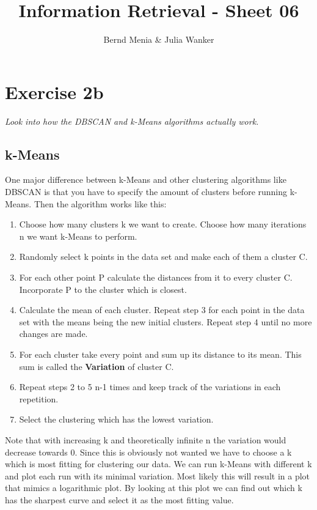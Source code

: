 \documentclass{article}
\author{Bernd Menia \& Julia Wanker}
\title{Information Retrieval - Sheet 06}
\begin{document}
	
\maketitle

\section{Exercise 2b}
\textit{Look into how the DBSCAN and k-Means algorithms actually work.}

\subsection{k-Means}
One major difference between k-Means and other clustering algorithms like DBSCAN is that you have to specify the amount of clusters before running k-Means. Then the algorithm works like this:  

\begin{enumerate}
	\item Choose how many clusters k we want to create. Choose how many iterations n we want k-Means to perform. 
	
	\item Randomly select k points in the data set and make each of them a cluster C. 
	
	\item For each other point P calculate the distances from it to every cluster C. Incorporate P to the cluster which is closest. 
	
	\item Calculate the mean of each cluster. Repeat step 3 for each point in the data set with the means being the new initial clusters. Repeat step 4 until no more changes are made. 
	
	\item For each cluster take every point and sum up its distance to its mean. This sum is called the \textbf{Variation} of cluster C. 
	
	\item Repeat steps 2 to 5 n-1 times and keep track of the variations in each repetition. 
	
	\item Select the clustering which has the lowest variation. 
\end{enumerate}	

\noindent Note that with increasing k and theoretically infinite n the variation would decrease towards 0. Since this is obviously not wanted we have to choose a k which is most fitting for clustering our data. We can run k-Means with different k and plot each run with its minimal variation. Most likely this will result in a plot that mimics a logarithmic plot. By looking at this plot we can find out which k has the sharpest curve and select it as the most fitting value. 
\end{document}
